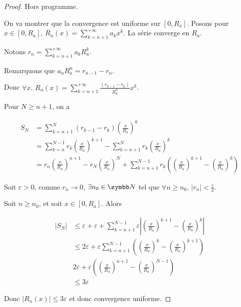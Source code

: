\begin{proof}
    Hors programme. 

    On va montrer que la convergence est uniforme sur $[0, R_a]$. Posons pour $x \in [0, R_a]$, 
    $\displaystyle R_n(x) = \sum_{k = n + 1}^{+\infty} a_k x^k$. La série converge en $R_a$. 

    Notons $\displaystyle r_n = \sum_{k = n + 1}^{+\infty} a_k R_a^k$. 

    Remarquons que $a_n R_a^n = r_{n - 1} - r_n$. 

    Donc $\displaystyle \forall x, \, R_n(x) = \sum_{k = n + 1}^{+\infty} \frac{(r_{k - 1} - r_k)}{R_a^k } x^k$. 
    
    Pour $N \geqslant n + 1$, on a

    \begin{align}
        S_N & = \sum_{k = n + 1 }^{N } (r_{k - 1} - r_k) \left( \frac x {R_a} \right)^k \\
        & = \sum_{k = n }^{ N - 1 } r_k \left(\frac x {R_a} \right)^{k + 1} - \sum_{k = n + 1}^N r_k \left( \frac x {R_a} \right)^k \\
        & = r_n \left( \frac{x }{R_a} \right)^{n + 1} - r_N \left( \frac x {R_a} \right)^N + \sum_{k = n + 1}^{N - 1} r_k \left( \left( \frac x {R_a} \right)^{k + 1} - \left( \frac x {R_a} \right)^k \right)
    \end{align}

    Soit $\varepsilon > 0$, comme $r_n \to 0$, $\exists n_0 \in \N$ tel que $\forall n \geqslant n_0, \, |r_n| < \frac{\varepsilon }{2 }$.

    Soit $n \geqslant n_0$, et soit $x \in [0, R_a]$.
    Alors 

    \begin{align}
        |S_N| & \leqslant \varepsilon + \varepsilon + \sum_{k = n + 1}^{N - 1}  \varepsilon \left| \left( \frac x {R_a} \right)^{k +1} - \left( \frac{x}{R_a } \right)^{k} \right| \\
        & \leqslant 2 \varepsilon + \varepsilon \sum_{k = n + 1}^{N - 1} \left( \left( \frac x {R_a} \right)^k - \left( \frac x {R_a} \right)^{k + 1} \right) \\ 
        & 2 \varepsilon + \varepsilon \left( \left( \frac x {R_a} \right)^{n + 1} - \left( \frac x {R_a} \right)^{N - 1}\right) \\
        & \leqslant 3 \varepsilon
    \end{align}

    Donc $|R_n(x)| \leqslant 3 \varepsilon$ et donc convergence uniforme. 
\end{proof}

